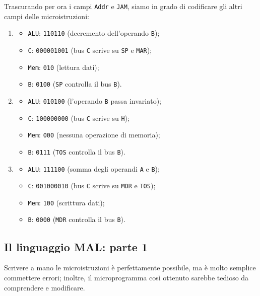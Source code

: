 \documentclass[a4paper,12pt]{scrreprt}
\begin{document}
Trascurando per ora i campi \lstinline{Addr} e \lstinline{JAM}, siamo in grado
di codificare gli altri campi delle microistruzioni:
\begin{enumerate}
  \item
  \begin{itemize}
    \item \lstinline{ALU}: \lstinline{110110} (decremento dell'operando \lstinline{B});
    \item \lstinline{C}: \lstinline{000001001} (bus \lstinline{C} scrive su
    \lstinline{SP} e \lstinline{MAR});
    \item \lstinline{Mem}: \lstinline{010} (lettura dati);
    \item \lstinline{B}: \lstinline{0100} (\lstinline{SP} controlla il bus \lstinline{B}).
  \end{itemize}
  \item
  \begin{itemize}
    \item \lstinline{ALU}: \lstinline{010100} (l'operando \lstinline{B} passa invariato);
    \item \lstinline{C}: \lstinline{100000000} (bus \lstinline{C} scrive su
    \lstinline{H});
    \item \lstinline{Mem}: \lstinline{000} (nessuna operazione di memoria);
    \item \lstinline{B}: \lstinline{0111} (\lstinline{TOS} controlla il bus \lstinline{B}).
  \end{itemize}
  \item
  \begin{itemize}
    \item \lstinline{ALU}: \lstinline{111100} (somma degli operandi
    \lstinline{A} e \lstinline{B});
    \item \lstinline{C}: \lstinline{001000010} (bus \lstinline{C} scrive su
    \lstinline{MDR} e \lstinline{TOS});
    \item \lstinline{Mem}: \lstinline{100} (scrittura dati);
    \item \lstinline{B}: \lstinline{0000} (\lstinline{MDR} controlla il bus \lstinline{B}).
  \end{itemize}
\end{enumerate}

\subsection{Il linguaggio MAL: parte 1}

Scrivere a mano le microistruzioni è perfettamente possibile, ma è molto
semplice commettere errori; inoltre, il microprogramma così ottenuto sarebbe
tedioso da comprendere e modificare.
\end{document}
